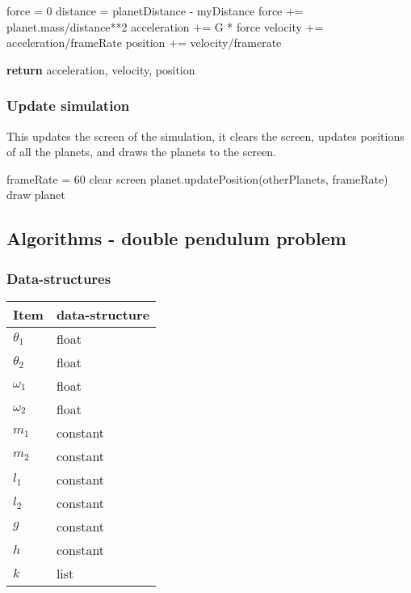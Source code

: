 \documentclass[12pt]{article}
\begin{document}
\begin{algorithmic}
    \State force = 0
        \State distance = planetDistance - myDistance
        \State force += planet.mass/distance**2
    \EndFor
    \State acceleration += G * force
    \State velocity += acceleration/frameRate
    \State position += velocity/framerate

    \State \textbf{return} acceleration, velocity, position
\EndProcedure
\end{algorithmic}

\newpage
\subsubsection{Update simulation}

This updates the screen of the simulation, it clears the screen, updates positions of all the planets, and draws the planets to the screen.\\

\begin{algorithmic}
\State frameRate = 60
    \State clear screen
        \State planet.updatePosition(otherPlanets, frameRate)
        \State draw planet
    \EndFor
\EndWhile
\end{algorithmic}

\subsection{Algorithms - double pendulum problem}

\subsubsection{Data-structures}
\begin{center}
\begin{tabularx}{0.8\textwidth} { 
  | >{\raggedright\arraybackslash}X 
  | >{\raggedleft\arraybackslash}X | }
 \hline
 \textbf{Item} & \textbf{data-structure} \\
 \hline
 $\theta_1$ & float \\
 \hline
 $\theta_2$ & float \\
 \hline
 $\omega_1$ & float \\
 \hline
 $\omega_2$ & float \\
 \hline
 $m_1$ & constant \\
 \hline
 $m_2$ & constant \\
 \hline
 $l_1$ & constant \\
 \hline
 $l_2$ & constant \\
 \hline
 $g$ & constant \\
 \hline
 $h$ & constant \\
 \hline
 $k$ & list \\
 \hline
\end{tabularx}
\end{center}
\end{document}
